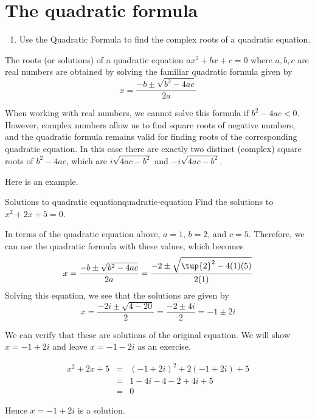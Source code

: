 \section{The quadratic formula}

\begin{outcome}
  \begin{enumerate}
  \item Use the Quadratic Formula to find the complex roots of a
    quadratic equation.
  \end{enumerate}
\end{outcome}

The roots (or solutions) of a quadratic equation $ax^{2}+bx+c=0$ where $a,b,c$ are real numbers are
obtained by solving the familiar quadratic formula
given by 
\begin{equation*}
x=
\frac{-b\pm \sqrt{b^{2}-4ac}}{2a}
\end{equation*}

When working with real numbers, we cannot solve this formula if
$b^{2}-4ac<0$. However, complex numbers allow us to find square roots
of negative numbers, and the quadratic formula remains valid for
finding roots of the corresponding quadratic equation.   In this case
there are exactly two distinct (complex) square roots of $b^{2}-4ac$, which are 
$i\sqrt{4ac-b^{2}}$ and $-i\sqrt{4ac-b^{2}}$.

Here is an example. 

\begin{example}{Solutions to quadratic equation}{quadratic-equation}
Find the solutions to $x^{2}+2x+5=0$.
\end{example}

\begin{solution}
In terms of the quadratic equation above, $a=1$, $b=2$, and $c=5$.
Therefore, we can use the quadratic formula with these values, which becomes
\begin{equation*}
x=
\frac{-b\pm \sqrt{b^{2}-4ac}}{2a}
= 
\frac{-2 \pm \sqrt{\tup{2}^{2} - 4 (1)(5)}}{2(1)}
\end{equation*}
Solving this equation, we see that the solutions are given by
\begin{equation*}
x=\frac{-2i\pm \sqrt{4-20}}{2}=\frac{-2\pm 4i}{2}=-1\pm 2i
\end{equation*}

We can verify that these are solutions of the original equation. 
We will show $x = -1+2i$ and leave $x = -1-2i$ as an exercise.

\begin{eqnarray*}
x^{2}+2x+5
&=& (-1+2i)^2 + 2(-1+2i) + 5 \\
&=& 1 - 4i - 4 -2 + 4i + 5 \\
&=& 0
\end{eqnarray*}

Hence $x = -1+2i$ is a solution. 
\end{solution}

